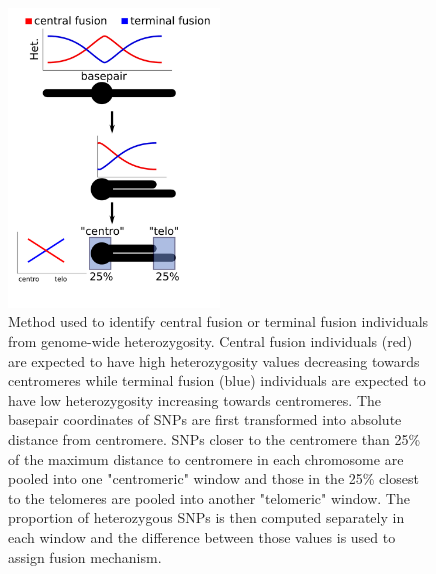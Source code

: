 \documentclass[10pt,a4paper]{report}
\begin{document}
\begin{figure}[h]
	\begin{center}
		\includegraphics[width=0.5\textwidth]{Num_CSD_loci/cen_tel.pdf}
		\caption{Method used to identify central fusion or terminal fusion individuals from genome-wide heterozygosity. Central fusion individuals (red) are expected to have high heterozygosity values decreasing towards centromeres while terminal fusion (blue) individuals are expected to have low heterozygosity increasing towards centromeres. The basepair coordinates of SNPs are first transformed into absolute distance from centromere. SNPs closer to the centromere than 25\% of the maximum distance to centromere in each chromosome are pooled into one "centromeric" window and those in the 25\% closest to the telomeres are pooled into another "telomeric" window. The proportion of heterozygous SNPs is then computed separately in each window and the difference between those values is used to assign fusion mechanism.}
		\label{schema_cen_tel}
	\end{center}
\end{figure}
\end{document}
